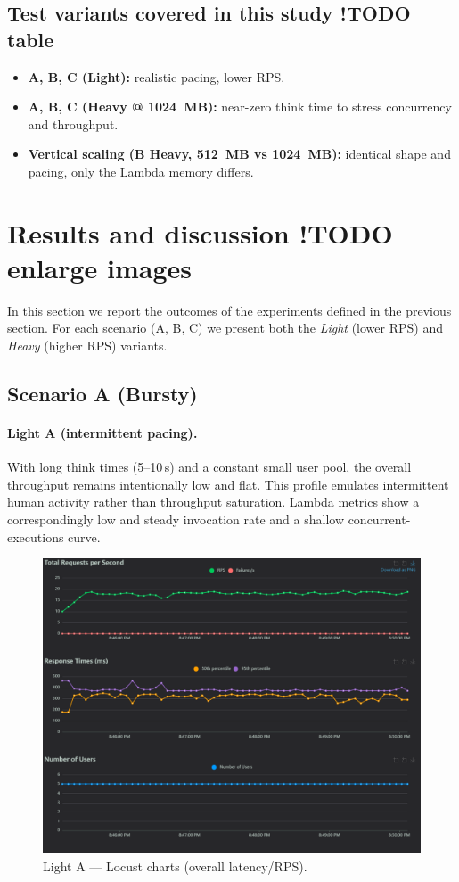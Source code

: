 \documentclass[11pt,a4paper]{article}
\begin{document}
\subsection{Test variants covered in this study !TODO table}
\begin{itemize}
  \item \textbf{A, B, C (Light):} realistic pacing, lower RPS.
  \item \textbf{A, B, C (Heavy @ \SI{1024}{MB}):} near-zero think time to stress concurrency and throughput.
  \item \textbf{Vertical scaling (B Heavy, \SI{512}{MB} vs \SI{1024}{MB}):} identical shape and pacing, only the Lambda memory differs.
\end{itemize}

\section{Results and discussion !TODO enlarge images}

In this section we report the outcomes of the experiments defined in the previous section. For each scenario (A, B, C) we present both the \emph{Light} (lower RPS) and \emph{Heavy} (higher RPS) variants.

\subsection{Scenario A (Bursty)}\label{subsec:resA}

\paragraph{Light A (intermittent pacing).}
With long think times (5--10\,s) and a constant small user pool, the overall throughput remains intentionally low and flat. This profile emulates intermittent human activity rather than throughput saturation. Lambda metrics show a correspondingly low and steady invocation rate and a shallow concurrent-executions curve.

\begin{figure}[h!] \centering
  \includegraphics[width=\linewidth]{"figures/lA - Charts.png"}
  \caption{Light A --- Locust charts (overall latency/RPS).}
\end{figure}
\end{document}
